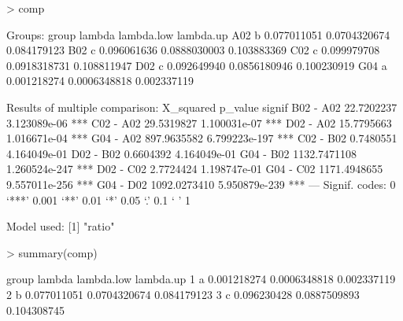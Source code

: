 \begin{example}
> comp

Groups:
    group      lambda   lambda.low   lambda.up
A02     b 0.077011051 0.0704320674 0.084179123
B02     c 0.096061636 0.0888030003 0.103883369
C02     c 0.099979708 0.0918318731 0.108811947
D02     c 0.092649940 0.0856180946 0.100230919
G04     a 0.001218274 0.0006348818 0.002337119

Results of multiple comparison:
             X_squared       p_value signif
B02 - A02   22.7202237  3.123089e-06    ***
C02 - A02   29.5319827  1.100031e-07    ***
D02 - A02   15.7795663  1.016671e-04    ***
G04 - A02  897.9635582 6.799223e-197    ***
C02 - B02    0.7480551  4.164049e-01       
D02 - B02    0.6604392  4.164049e-01       
G04 - B02 1132.7471108 1.260524e-247    ***
D02 - C02    2.7724424  1.198747e-01       
G04 - C02 1171.4948655 9.557011e-256    ***
G04 - D02 1092.0273410 5.950879e-239    ***
---
Signif. codes:  0 ‘***’ 0.001 ‘**’ 0.01 ‘*’ 0.05 ‘.’ 0.1 ‘ ’ 1

Model used:
[1] "ratio"

> summary(comp)

  group      lambda   lambda.low   lambda.up
1     a 0.001218274 0.0006348818 0.002337119
2     b 0.077011051 0.0704320674 0.084179123
3     c 0.096230428 0.0887509893 0.104308745
\end{example}


